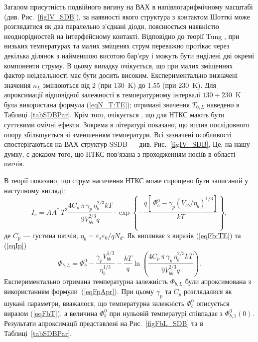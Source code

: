 Загалом присутність подвійного вигину на ВАХ в напівлогарифмічному масштабі (див. Рис.~\ref{figIV_SDB}),
за наявності якого структура з контактом Шотткі може розглядатися як два паралельно з'єднані діоди, пояснюється наявністю неоднорідностей на інтерфейсному контакті.
Відповідно до теорії Tung \cite{Tung:PhysRev,Tung:MSE},
при низьких температурах та малих зміщенях струм переважно протікає через декілька ділянок з найменшою висотою бар'єру і можуть бути виділені дві окремі компоненти струму.
В цьому випадку очікується, що при малих зміщеннях фактор неідеальності має бути досить високим.
Експериментально визначені значення $n_L$ змінюються від 2 (при 130~K) до 1.55 (при 230~K).
Для апроксимації відповідної залежності в температурному інтервалі $130\div230$~K була використана формула (\ref{eqN_T:TE});
отримані значення $T_{0,L}$ наведено в Таблиці~\ref{tabSDBPar}.
Крім того, очікується \cite{Tung:PhysRev,Tung:MSE}, що для НТКС мають бути суттєвими омічні ефекти.
Зокрема в літературі  \cite{Gammon2013} показано, що вплив послідовного опору збільшується зі зменшенням температури.
Всі зазначені особливості спостерігаються на ВАХ структур SSDB --- див. Рис.~\ref{figIV_SDB},
Це, на нашу думку, є доказом того, що НТКС пов'язана з проходженням носіїв в області патчів.


В теорії \cite{Tung:PhysRev} показано, що струм насичення НТКС може спрощено бути записаний у наступному вигляді:
\begin{equation}
\label{eqIp}
I_s=AA^*\,T^2\frac{4C_p\,\pi\,\gamma_p\,\eta_b^{2/3}kT}{9V_{bb}^{2/3}q}\cdot
\exp\left\{-\frac{q\left[\,\Phi_{b}^0-\gamma_p (V_{bb}/\eta_b)^{1/3}\right]}{kT}\right\},
\end{equation}
де
$C_p$ --- густина патчів,
$\eta_{b}=\varepsilon_s\varepsilon_0/qN_d$.
Як випливає з виразів (\ref{eqFb:TE}) та (\ref{eqIp})
\begin{equation}
\label{eqFpApr}
\Phi_{b,L}=\Phi_{b}^0-\frac{\gamma_p V_{bb}^{1/3}}{\eta_b^{1/3}} -\frac{kT}{q}\ln\left(\frac{4C_p\,\pi\,\gamma_p\,\eta_b^{2/3}kT}{9V_{bb}^{2/3}q}\right).
\end{equation}
Експериментально отримана температурна залежність $\Phi_{b,L}$ були апроксимована з використанням формули~(\ref{eqFpApr}).
При цьому $\gamma_p$ та $C_p$ розглядалися як шукані параметри,
вважалося, що температурна залежність $\Phi_{b}^0$ описується виразом (\ref{eqFbT}), а величина $\Phi_{b}^0$ при нульовій температурі
співпадає з $\Phi_{b,1}^0(0)$.
Результати апроксимації представлені на Рис.~\ref{figFbL_SDB} та в Таблиці~\ref{tabSDBPar}.

